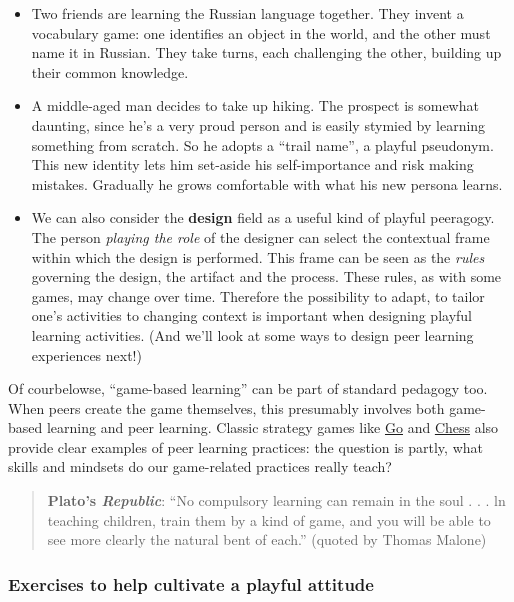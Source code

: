 \begin{itemize}
\item
  Two friends are learning the Russian language together. They invent a
  vocabulary game: one identifies an object in the world, and the other
  must name it in Russian. They take turns, each challenging the other,
  building up their common knowledge.
\item
  A middle-aged man decides to take up hiking. The prospect is somewhat
  daunting, since he's a very proud person and is easily stymied by
  learning something from scratch. So he adopts a ``trail name'', a
  playful pseudonym. This new identity lets him set-aside his
  self-importance and risk making mistakes. Gradually he grows
  comfortable with what his new persona learns.
\item
  We can also consider the \textbf{design} field as a useful kind of
  playful peeragogy. The person \emph{playing the role} of the designer
  can select the contextual frame within which the design is performed.
  This frame can be seen as the \emph{rules} governing the design, the
  artifact and the process. These rules, as with some games, may change
  over time. Therefore the possibility to adapt, to tailor one's
  activities to changing context is important when designing playful
  learning activities. (And we'll look at some ways to design peer
  learning experiences next!)
\end{itemize}
Of courbelowse, ``game-based learning'' can be part of standard pedagogy
too. When peers create the game themselves, this presumably involves
both game-based learning and peer learning. Classic strategy games like
\href{http://senseis.xmp.net/?MythOfOrigin}{Go} and
\href{http://www.amazon.com/Chess-Success-Using-Strengths-Children/dp/0767915682}{Chess}
also provide clear examples of peer learning practices: the question is
partly, what skills and mindsets do our game-related practices really
teach?

\begin{quote}
\textbf{Plato's \emph{Republic}}: ``No compulsory learning can remain in
the soul . . . ln teaching children, train them by a kind of game, and
you will be able to see more clearly the natural bent of each.'' (quoted
by Thomas Malone)
\end{quote}
\subsubsection{Exercises to help cultivate a playful attitude}

